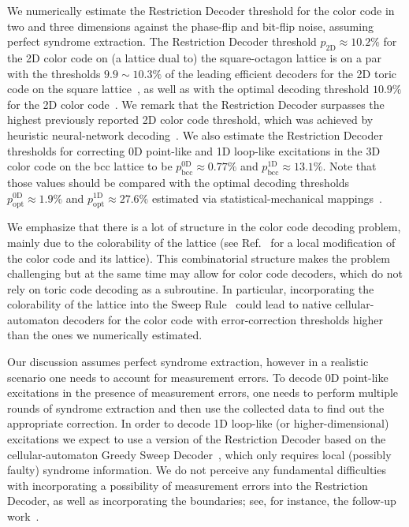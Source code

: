 \documentclass[onecolumn,letterpaper,11pt,accepted=2022-12-19]{quantumarticle}
\newcommand{\psqoct}{10.2\%}
\theoremstyle{definition}
\theoremstyle{lemma}
\theoremstyle{theorem}
\theoremstyle{corollary}
\begin{document}
{We numerically estimate the Restriction Decoder threshold for the color code in two and three dimensions against the phase-flip and bit-flip noise, assuming perfect syndrome extraction.
The Restriction Decoder threshold $p_{\textrm{2D}} \approx \psqoct$ for the 2D color code on (a lattice dual to) the square-octagon lattice is on a par with the thresholds $9.9\sim 10.3\%$ of the leading efficient decoders for the 2D toric code on the square lattice~\cite{Dennis2002,Delfosse2017}, as well as with the optimal decoding threshold $10.9\%$ for the 2D color code~\cite{Katzgraber2009}.
We remark that the Restriction Decoder surpasses the highest previously reported 2D color code threshold, which was achieved by heuristic neural-network decoding~\cite{Maskara2018}. 
We also estimate the Restriction Decoder thresholds for correcting 0D point-like and 1D loop-like excitations in the 3D color code on the bcc lattice to be $p^{\textrm{0D}}_{\textrm{bcc}} \approx 0.77\%$ and $p^{\textrm{1D}}_{\textrm{bcc}} \approx 13.1\%$.
Note that those values should be compared with the optimal decoding thresholds $p^{\textrm{0D}}_{\textrm{opt}} \approx 1.9\%$ and $p^{\textrm{1D}}_{\textrm{opt}} \approx 27.6\%$ estimated via statistical-mechanical mappings~\cite{Kubica2017}.


We emphasize that there is a lot of structure in the color code decoding problem, mainly due to the colorability of the lattice (see Ref.~\cite{Vasmer2022} for a local modification of the color code and its lattice).
This combinatorial structure makes the problem challenging but at the same time may allow for color code decoders, which do not rely on toric code decoding as a subroutine.
In particular, incorporating the colorability of the lattice into the Sweep Rule~\cite{Kubica2018toom} could lead to native cellular-automaton decoders for the color code with error-correction thresholds higher than the ones we numerically estimated.


Our discussion assumes perfect syndrome extraction, however in a realistic scenario one needs to account for measurement errors.
To decode 0D point-like excitations in the presence of measurement errors, one needs to perform multiple rounds of syndrome extraction and then use the collected data to find out the appropriate correction.
In order to decode 1D loop-like (or higher-dimensional) excitations we expect to use a version of the Restriction Decoder based on the cellular-automaton Greedy Sweep Decoder~\cite{Kubica2018toom,Vasmer2021}, which only requires local (possibly faulty) syndrome information.
We do not perceive any fundamental difficulties with incorporating a possibility of measurement errors into the Restriction Decoder, as well as incorporating the boundaries; see, for instance, the follow-up work~\cite{Chamberland2020}.


}
\end{document}
